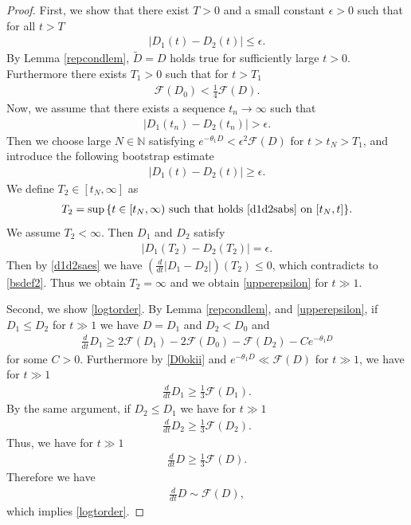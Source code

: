 \documentclass[reqno]{amsart}
\theoremstyle{plain}
\theoremstyle{definition}
\numberwithin{equation}{section}
\newcommand{\1}{\mathbbm{1}}
\begin{document}
\begin{proof}
First, we show that there exist $T>0$ and a small constant $\epsilon>0$ such that for all $t>T$
\begin{align}\label{upperepsilon}
|D_1(t)-D_2(t)|\leq \epsilon.
\end{align}
By Lemma \ref{repcondlem}, $\tilde{D}=D$ holds true for sufficiently large $t>0$. Furthermore there exists $T_1>0$ such that for $t>T_1$
\begin{align}\label{D0okii}
\mathcal{F}(D_0)<\frac{1}{4}\mathcal{F}(D).
\end{align}
Now, we assume that there exists a sequence $t_n\to\infty$ such that 
\begin{align*}
|D_1(t_n)-D_2(t_n)|>\epsilon.
\end{align*}
Then we choose large $N\in \mathbb{N}$ satisfying $e^{-\theta_1 D}<\epsilon^2\mathcal{F}(D)$ for $t>t_N>T_1$, and introduce the following bootstrap estimate
\begin{align}\label{d1d2sabs}
|D_1(t)-D_2(t)|\geq \epsilon.
\end{align}
We define $T_2\in [t_N,\infty]$ as 
\begin{align}\label{bsdef2}
T_2=\sup{\{ t\in[t_N, \infty)\ \mbox{such that holds}\ \eqref{d1d2sabs}\ \mbox{on}\ [t_N,t] \}} .
\end{align}
We assume $T_2<\infty$. Then $D_1$ and $D_2$ satisfy
\begin{align*}
|D_1(T_2)-D_2(T_2)|=\epsilon.
\end{align*}
Then by \eqref{d1d2saes} we have $\left(\frac{d}{dt}|D_1-D_2|\right)(T_2)\leq  0$, which contradicts to \eqref{bsdef2}. Thus we obtain $T_2=\infty$ and we obtain \eqref{upperepsilon} for $t\gg 1$.

Second, we show \eqref{logtorder}. By Lemma \ref{repcondlem}, and \eqref{upperepsilon}, if $D_1\leq D_2$ for $t\gg 1$ we have $D=D_1$ and $D_2<D_0$ and 
\begin{align*}
\frac{d}{dt}D_1\geq 2\mathcal{F}(D_1)-2\mathcal{F}(D_0)-\mathcal{F}(D_2)-Ce^{-\theta_1 D}
\end{align*}
for some $C>0$. Furthermore by \eqref{D0okii} and $e^{-\theta_1 D}\ll \mathcal{F}(D)$ for $t\gg1$, we have for $t\gg 1$
\begin{align*}
\frac{d}{dt}D_1\geq \frac{1}{3}\mathcal{F}(D_1).
\end{align*}
By the same argument, if $D_2\leq D_1$ we have for $t\gg 1$
\begin{align*}
\frac{d}{dt}D_2\geq \frac{1}{3}\mathcal{F}(D_2).
\end{align*}
Thus, we have for $t\gg 1$
\begin{align*}
\frac{d}{dt}D\geq \frac{1}{3}\mathcal{F}(D).
\end{align*}
Therefore we have 
\begin{align*}
\frac{d}{dt}D\sim \mathcal{F}(D),
\end{align*}
which implies \eqref{logtorder}.


\end{proof}
\end{document}
